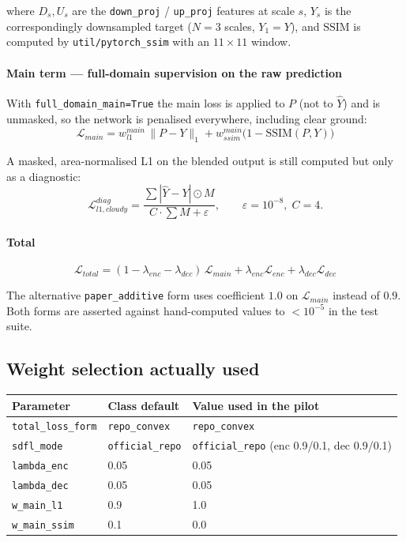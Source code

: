 \documentclass[10pt,a4paper]{article}
\newcommand{\code}[1]{\texttt{#1}}
\begin{document}
where $D_s, U_s$ are the \code{down\_proj} / \code{up\_proj} features at scale $s$, $Y_s$ is the
correspondingly downsampled target ($N=3$ scales, $Y_1 = Y$), and $\mathrm{SSIM}$ is computed by
\code{util/pytorch\_ssim} with an $11\times11$ window.

\paragraph{Main term --- full-domain supervision on the raw prediction}
With \code{full\_domain\_main=True} the main loss is applied to $P$ (not to $\hat Y$) and is
unmasked, so the network is penalised everywhere, including clear ground:
\begin{equation}
\mathcal{L}_{main} = w^{main}_{l1}\,\|P - Y\|_1
      + w^{main}_{ssim}\big(1 - \mathrm{SSIM}(P, Y)\big)
\end{equation}

A masked, area-normalised L1 on the blended output is still computed but only as a diagnostic:
\begin{equation}
\mathcal{L}^{diag}_{l1,cloudy} = \frac{\sum |\hat Y - Y| \odot M}{C\cdot\sum M + \varepsilon},
\qquad \varepsilon = 10^{-8},\; C = 4 .
\end{equation}

\paragraph{Total}
\begin{equation}
\mathcal{L}_{total} = (1-\lambda_{enc}-\lambda_{dec})\,\mathcal{L}_{main}
      + \lambda_{enc}\mathcal{L}_{enc} + \lambda_{dec}\mathcal{L}_{dec}
\end{equation}

The alternative \code{paper\_additive} form uses coefficient $1.0$ on $\mathcal{L}_{main}$ instead
of $0.9$. Both forms are asserted against hand-computed values to $<10^{-5}$ in the test suite.

\subsection{Weight selection actually used}

\begin{center}
\begin{tabular}{@{}lll@{}}
\hline
Parameter & Class default & Value used in the pilot \\
\hline
\code{total\_loss\_form} & \code{repo\_convex} & \code{repo\_convex} \\
\code{sdfl\_mode} & \code{official\_repo} & \code{official\_repo} (enc 0.9/0.1, dec 0.9/0.1) \\
\code{lambda\_enc} & 0.05 & 0.05 \\
\code{lambda\_dec} & 0.05 & 0.05 \\
\code{w\_main\_l1} & 0.9 & 1.0 \\
\code{w\_main\_ssim} & 0.1 & 0.0 \\
\hline
\end{tabular}
\end{center}
\end{document}
